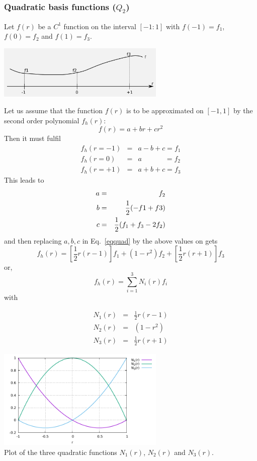 \newpage
\subsubsection{Quadratic basis functions ($Q_2$) \label{sec:bf2}}

Let $f(r)$ be a $C^1$ function on the interval $[-1:1]$ with $f(-1)=f_1$, $f(0)=f_2$ and $f(1)=f_3$.
\begin{center}
\includegraphics[width=8cm]{images/quadshapefct.png}
\end{center}
Let us assume that the function $f(r)$ is to be approximated on $[-1,1]$ by the second order polynomial 
$f_h(r)$:
\begin{equation}
f(r)=a+br+cr^2 \label{eqquad}
\end{equation}
Then it must fulfil
\begin{eqnarray}
f_h(r=-1)&=&a-b+c = f_1 \nonumber\\
f_h(r=0) &=&a\quad\quad\quad\;     = f_2 \nonumber\\
f_h(r=+1)&=&a+b+c = f_3 \nonumber
\end{eqnarray}
This leads to
\begin{eqnarray}
a&=&f_2   \nonumber\\
b&=&\frac{1}{2}(-f1+f3)  \nonumber\\
c&=&\frac{1}{2}(f_1+f_3-2f_2) 
\end{eqnarray}
and then replacing $a,b,c$ in Eq.~\eqref{eqquad} by the above values on gets
\[
f_h(r)=\left[\frac{1}{2}r(r-1)\right] f_1 + (1-r^2) f_2 + \left[\frac{1}{2}r(r+1)\right] f_3
\]
or,
\[
\boxed{
f_h(r) = \sum_{i=1}^3 N_i(r) f_i
}
\]
with
\begin{mdframed}[backgroundcolor=blue!5]
\begin{eqnarray}
N_1(r) &=& \frac{1}{2}r(r-1) \nonumber\\
N_2(r) &=& (1-r^2) \nonumber\\ 
N_3(r) &=& \frac{1}{2}r(r+1) 
\end{eqnarray}
\end{mdframed}

\begin{center}
\includegraphics[width=8cm]{images/basis1D/quadratic.pdf}\\
{\captionfont Plot of the three quadratic functions $N_1(r)$, $N_2(r)$ and $N_3(r)$.}
\end{center}

